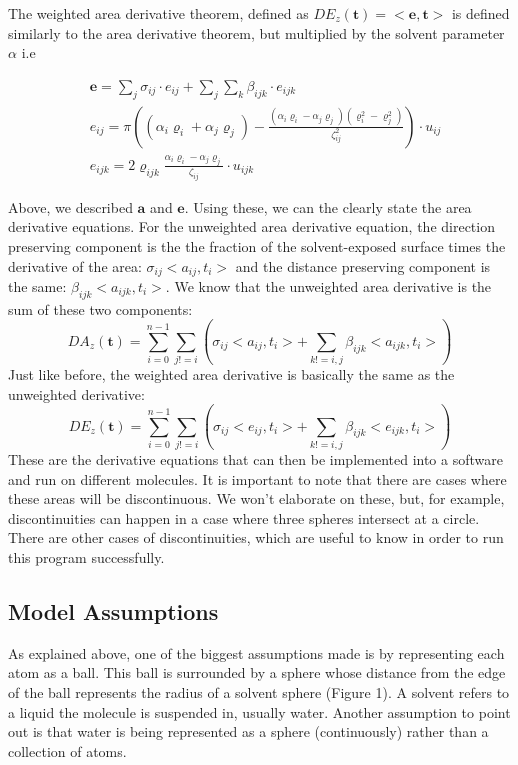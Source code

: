 \documentclass{article}
\begin{document}
The weighted area derivative theorem, defined as $DE_z(\textbf{t}) = <\textbf{e},\textbf{t}>$ is defined similarly to the area derivative theorem, but multiplied by the solvent parameter $\alpha$ i.e

\begin{align*}
&\textbf{e} = \sum_j \sigma_{ij}\cdot e_{ij}+ \sum_j \sum_k \beta_{ijk} \cdot e_{ijk} \\
&e_{ij} = \pi\left((\alpha_i\varrho_i +\alpha_j\varrho_j) - \frac{(\alpha_i\varrho_i  - \alpha_j \varrho_j)(\varrho_i^2 - \varrho_j^2)}{\zeta_{ij}^2}\right)\cdot u_{ij} \\
&e_{ijk} = 2\varrho_{ijk}\frac{\alpha_i\varrho_i - \alpha_j\varrho_j}{\zeta_{ij}}\cdot u_{ijk}
\end{align*}

Above, we described $\textbf{a}$ and $\textbf{e}$. Using these, we can the clearly state the area derivative equations. For the unweighted area derivative equation, the direction preserving component is the the fraction of the solvent-exposed surface times the derivative of the area: $\sigma_{ij}<a_{ij},t_i>$ and the distance preserving component is the same: $\beta_{ijk}<a_{ijk},t_i>$. We know that the unweighted area derivative is the sum of these two components:
\begin{equation}
DA_z(\textbf{t}) = \sum_{i=0}^{n-1}\sum_{j!=i}\left(\sigma_{ij}<a_{ij},t_i> + \sum_{k!=i,j} \beta_{ijk}<a_{ijk},t_i>\right)
\end{equation}
Just like before, the weighted area derivative is basically the same as the unweighted derivative: 
\begin{equation}
DE_z(\textbf{t}) = \sum_{i=0}^{n-1}\sum_{j!=i}\left(\sigma_{ij}<e_{ij},t_i> + \sum_{k!=i,j} \beta_{ijk}<e_{ijk},t_i>\right)
\end{equation}
These are the derivative equations that can then be implemented into a software and run on different molecules. It is important to note that there are cases where these areas will be discontinuous. We won't elaborate on these, but, for example, discontinuities can happen in a case where three spheres intersect at a circle. There are other cases of discontinuities, which are useful to know in order to run this program successfully.

\subsection{Model Assumptions}
As explained above, one of the biggest assumptions made is by representing each atom as a ball. This ball is surrounded by a sphere whose distance from the edge of the ball represents the radius of a solvent sphere (Figure 1). A solvent refers to a liquid the molecule is suspended in, usually water. Another assumption to point out is that water is being represented as a sphere (continuously) rather than a collection of atoms. 
\end{document}
